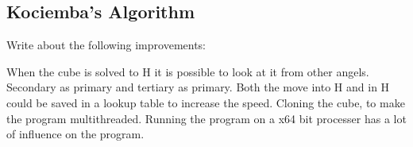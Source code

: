 
\subsection{Kociemba's Algorithm}
Write about the following improvements:

When the cube is solved to H it is possible to look at it from other angels. Secondary as primary and tertiary as primary.
Both the move into H and in H could be saved in a lookup table to increase the speed.
Cloning the cube, to make the program multithreaded.
Running the program on a x64 bit processer has a lot of influence on the program. 